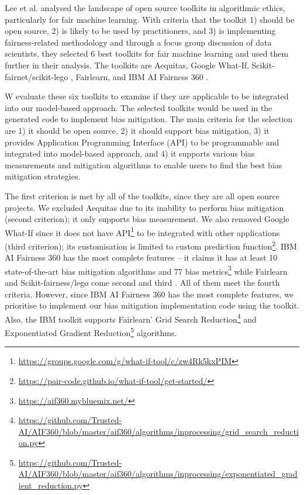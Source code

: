 \documentclass[sigconf,review]{acmart}
\begin{document}
Lee et al. \cite{lee2021landscape} analysed the landscape of open source toolkits in algorithmic ethics, particularly for fair machine learning. With criteria that the toolkit 1) should be open source, 2) is likely to be used by practitioners, and 3) is implementing fairness-related methodology and through a focus group discussion of data scientists, they selected 6 best toolkits for fair machine learning and used them further in their analysis. The toolkits are Aequitas\cite{saleiro2019aequitas}, Google What-If\cite{googlewhatif2020}, Scikit-fairnet/scikit-lego \cite{scikitfairness2022,scikitlego2022}, Fairlearn\cite{bird2020fairlearn}, and IBM AI Fairness 360 \cite{bellamy2018ai}.  

W evaluate these six toolkits to examine if they are applicable to be integrated into our model-based approach. The selected toolkits would be used in the generated code to implement bias mitigation. The main criteria for the selection are 1) it should be open source, 2) it should support bias mitigation, 3) it provides Application Programming Interface (API) to be programmable and integrated into model-based approach, and 4) it supports various bias measurements and mitigation algorithms to enable users to find the best bias mitigation strategies. 

The first criterion is met by all of the toolkits, since they are all open source projects. We excluded Aequitas due to its inability to perform bias mitigation (second criterion); it only supports bias measurement. We also removed Google What-If since it does not have API\footnote{\url{https://groups.google.com/g/what-if-tool/c/zw4Rk5kxPIM}} to be integrated with other applications (third criterion); its customisation is limited to custom prediction function\footnote{\url{https://pair-code.github.io/what-if-tool/get-started/}}. IBM AI Fairness 360 has the most complete features -- it claims it has at least 10 state-of-the-art bias mitigation algorithms and 77 bias metrics\footnote{\url{https://aif360.mybluemix.net/}} while Fairlearn and Scikit-fairness/lego come second and third \cite{lee2021landscape}. All of them meet the fourth criteria. However, since IBM AI Fairness 360 has the most complete features, we prioritise to implement our bias mitigation implementation code using the toolkit. Also, the IBM toolkit supports Fairlearn' Grid Search Reduction\footnote{\url{https://github.com/Trusted-AI/AIF360/blob/master/aif360/algorithms/inprocessing/grid\_search\_reduction.py}} and Exponentiated Gradient Reduction\footnote{\url{https://github.com/Trusted-AI/AIF360/blob/master/aif360/algorithms/inprocessing/exponentiated\_gradient\_reduction.py}} algorithms.
\end{document}
